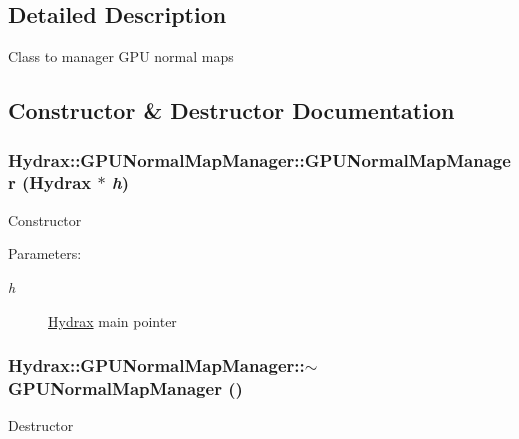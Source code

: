 \subsection{Detailed Description}
Class to manager GPU normal maps 

\subsection{Constructor \& Destructor Documentation}
\hypertarget{class_hydrax_1_1_g_p_u_normal_map_manager_9c2a79cec8c9a72e2916587e09c9c83f}{
\subsubsection[{GPUNormalMapManager}]{\setlength{\rightskip}{0pt plus 5cm}Hydrax::GPUNormalMapManager::GPUNormalMapManager ({\bf Hydrax} $\ast$ {\em h})}}
\label{class_hydrax_1_1_g_p_u_normal_map_manager_9c2a79cec8c9a72e2916587e09c9c83f}


Constructor \begin{Desc}
\item[Parameters:]
\begin{description}
\item[{\em h}]\hyperlink{class_hydrax_1_1_hydrax}{Hydrax} main pointer \end{description}
\end{Desc}
\hypertarget{class_hydrax_1_1_g_p_u_normal_map_manager_00de9b3c181b8b91e1a8448f4e70976c}{
\subsubsection[{$\sim$GPUNormalMapManager}]{\setlength{\rightskip}{0pt plus 5cm}Hydrax::GPUNormalMapManager::$\sim$GPUNormalMapManager ()}}
\label{class_hydrax_1_1_g_p_u_normal_map_manager_00de9b3c181b8b91e1a8448f4e70976c}


Destructor 

